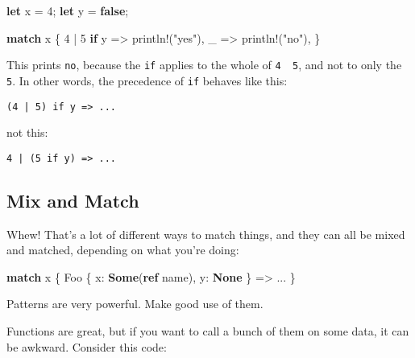 \documentclass[a4paper,]{book}
\newenvironment{Shaded}{\begin{snugshade}}{\end{snugshade}}
\newcommand{\KeywordTok}[1]{\textcolor[rgb]{0.13,0.29,0.53}{\textbf{{#1}}}}
\newcommand{\DecValTok}[1]{\textcolor[rgb]{0.00,0.00,0.81}{{#1}}}
\newcommand{\StringTok}[1]{\textcolor[rgb]{0.31,0.60,0.02}{{#1}}}
\newcommand{\OtherTok}[1]{\textcolor[rgb]{0.56,0.35,0.01}{{#1}}}
\newcommand{\NormalTok}[1]{{#1}}
\begin{document}
\begin{Shaded}
\begin{Highlighting}[]
\KeywordTok{let} \NormalTok{x = }\DecValTok{4}\NormalTok{;}
\KeywordTok{let} \NormalTok{y = }\KeywordTok{false}\NormalTok{;}

\KeywordTok{match} \NormalTok{x \{}
    \DecValTok{4} \NormalTok{| }\DecValTok{5} \KeywordTok{if} \NormalTok{y => }\OtherTok{println!}\NormalTok{(}\StringTok{"yes"}\NormalTok{),}
    \NormalTok{_ => }\OtherTok{println!}\NormalTok{(}\StringTok{"no"}\NormalTok{),}
\NormalTok{\}}
\end{Highlighting}
\end{Shaded}

This prints \texttt{no}, because the \texttt{if} applies to the whole of
\texttt{4\ \textbar{}\ 5}, and not to only the \texttt{5}. In other
words, the precedence of \texttt{if} behaves like this:

\begin{verbatim}
(4 | 5) if y => ...
\end{verbatim}

not this:

\begin{verbatim}
4 | (5 if y) => ...
\end{verbatim}

\subsection{Mix and Match}\label{mix-and-match}

Whew! That's a lot of different ways to match things, and they can all
be mixed and matched, depending on what you're doing:

\begin{Shaded}
\begin{Highlighting}[]
\KeywordTok{match} \NormalTok{x \{}
    \NormalTok{Foo \{ x: }\KeywordTok{Some}\NormalTok{(}\KeywordTok{ref} \NormalTok{name), y: }\KeywordTok{None} \NormalTok{\} => ...}
\NormalTok{\}}
\end{Highlighting}
\end{Shaded}

Patterns are very powerful. Make good use of them.


Functions are great, but if you want to call a bunch of them on some
data, it can be awkward. Consider this code:
\end{document}
